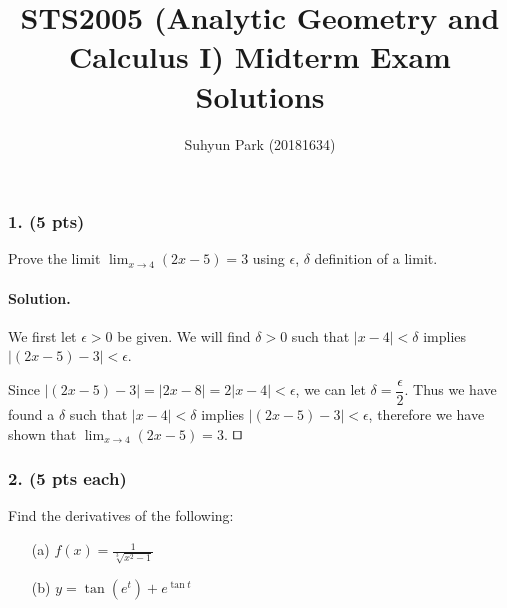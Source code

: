 
	


\title{STS2005 (Analytic Geometry and Calculus I) \newline Midterm Exam Solutions}
\author{Suhyun Park (20181634)}
\maketitle

\subsubsection{1. (5 pts)} Prove the limit $\lim_{x\rightarrow 4}\left(2x - 5\right) = 3$ using $\epsilon$, $\delta$ definition of a limit.

\paragraph{Solution.} We first let $\epsilon > 0$ be given. We will find $\delta > 0$ such that $\left|x - 4\right| < \delta$ implies $\left|\left(2x - 5\right) - 3\right| < \epsilon$.

Since $\left|\left(2x - 5\right) - 3\right| = \left|2x - 8\right| = 2\left|x - 4\right| < \epsilon$, we can let $\delta = \dfrac{\epsilon}{2}$. Thus we have found a $\delta$ such that $\left|x - 4\right| < \delta$ implies $\left|\left(2x - 5\right) - 3\right| < \epsilon$, therefore we have shown that $\lim_{x\rightarrow 4}\left(2x - 5\right) = 3$. $\qed$

\subsubsection{2. (5 pts each)} Find the derivatives of the following:

\begin{itemize}
    \item [(a)] $\displaystyle f\left(x\right) = \frac{1}{\sqrt[3]{x^2-1}}$
    \item [(b)] $\displaystyle y = \tan\left(e^t\right) + e^{\tan t}$
\end{itemize}

